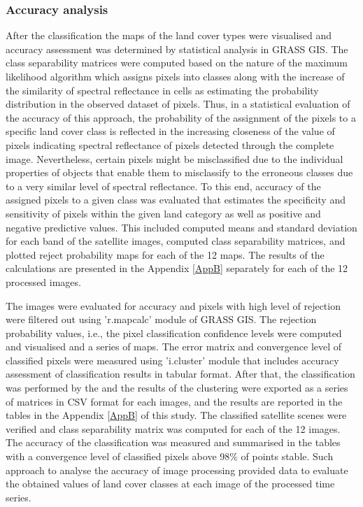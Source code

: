 \documentclass[environments,article,submit,pdftex,moreauthors]{Definitions/mdpi}
\begin{document}

 \subsubsection{Accuracy analysis}

After the classification the maps of the land cover types were visualised and accuracy assessment was determined by statistical analysis in GRASS GIS. The class separability matrices were computed based on the nature of the maximum likelihood algorithm which assigns pixels into classes along with the increase of the similarity of spectral reflectance in cells as estimating the probability distribution in the observed dataset of pixels. Thus, in a statistical evaluation of the accuracy of this approach, the probability of the assignment of the pixels to a specific land cover class is reflected in the increasing closeness of the value of pixels indicating spectral reflectance of pixels detected through the complete image. Nevertheless, certain pixels might be misclassified due to the individual properties of objects that enable them to misclassify to the erroneous classes due to a very similar level of spectral reflectance. To this end, accuracy of the assigned pixels to a given class was evaluated that estimates the specificity and sensitivity of pixels within the given land category as well as positive and negative predictive values. This included computed means and standard deviation for each band of the satellite images, computed class separability matrices, and plotted reject probability maps for each of the 12 maps. The results of the calculations are presented in the Appendix \ref{AppB} separately for each of the 12 processed images.

 The images were evaluated for accuracy and pixels with high level of rejection were filtered out using 'r.mapcalc' module of GRASS GIS. The rejection probability values, i.e., the pixel classification confidence levels were computed and visualised and a series of maps. The error matrix and  convergence level of classified pixels were measured using 'i.cluster' module that includes accuracy assessment of classification results in tabular format. After that, the classification was performed by the and the results of the clustering were exported as a series of matrices in CSV format for each images, and the results are reported in the tables in the Appendix \ref{AppB} of this study. The classified satellite scenes were verified and class separability matrix was computed for each of the 12 images. The accuracy of the classification was measured and summarised in the tables with a convergence level of classified pixels above 98\% of points stable. Such approach to analyse the accuracy of image processing provided data to evaluate the obtained values of land cover classes at each image of the processed time series.
 
\end{document}
